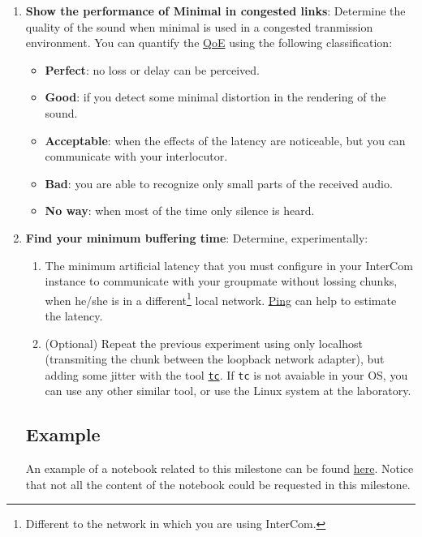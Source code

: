 \begin{enumerate}
\item \textbf{Show the performance of Minimal in congested links}:
Determine the quality of the sound when minimal is used in a congested
tranmission environment. You can quantify the
\href{https://en.wikipedia.org/wiki/Quality_of_experience}{QoE} using
the following classification:
\begin{itemize}
\item \textbf{Perfect}: no loss or delay can be perceived.
\item \textbf{Good}: if you detect some minimal distortion in the
  rendering of the sound.
\item \textbf{Acceptable}: when the effects of the latency are
  noticeable, but you can communicate with your interlocutor.
\item \textbf{Bad}: you are able to recognize only small parts of the
  received audio.
\item \textbf{No way}: when most of the time only silence is heard.
\end{itemize}

\item \textbf{Find your minimum buffering time}:
Determine, experimentally:
\begin{enumerate}
\item The minimum artificial latency that you must configure in your
  InterCom instance to communicate with your groupmate without lossing
  chunks, when he/she is in a different\footnote{Different to the network
    in which you are using InterCom.} local network. \href{https://vicente-gonzalez-ruiz.github.io/about_ping/}{Ping} can help to estimate the latency.
\item (Optional) Repeat the previous experiment using only localhost
  (transmiting the chunk between the loopback network adapter), but
  adding some jitter with the tool
  \href{https://vicente-gonzalez-ruiz.github.io/about_tc/}{\texttt{tc}}. If
  \texttt{tc} is not avaiable in your OS, you can use any other
  similar tool, or use the Linux system at the laboratory.
\end{enumerate}

\subsection*{Example}
An example of a notebook related to this milestone can be found
\href{https://github.com/Tecnologias-multimedia/InterCom/blob/master/docs/Hidding_the_Network_Jitter__example.ipynb}{here}. Notice
that not all the content of the notebook could be requested in this
milestone.

\end{enumerate}


